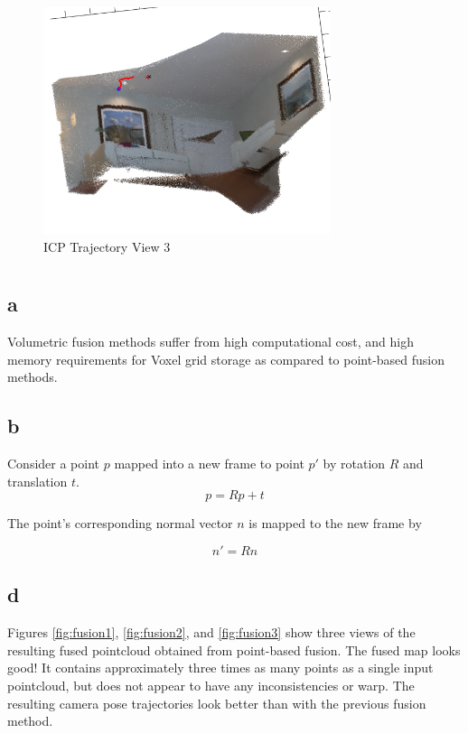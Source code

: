 \documentclass[12pt]{article}
\begin{document}
\begin{figure}[H]
\centering
\includegraphics[page=1,width=0.75\textwidth]{2d_view3}
\caption{ ICP Trajectory View 3 } 
\label{fig:2dview3}
\end{figure}   

\section{}
\subsection{a}
Volumetric fusion methods suffer from high computational cost, and high memory requirements for Voxel grid storage as compared to point-based fusion methods.
\subsection{b}
Consider a point $p$ mapped into a new frame to point $p'$ by rotation $R$ and translation $t$.
\begin{equation}
p = R p + t
\end{equation}
  
The point's corresponding normal vector $n$ is mapped to the new frame by

\begin{equation}
n' = R n
\end{equation}

\subsection{d}
Figures \ref{fig:fusion1}, \ref{fig:fusion2}, and \ref{fig:fusion3} show three views of the resulting fused pointcloud obtained from point-based fusion. The fused map looks good! It contains  approximately three times as many points as a single input pointcloud, but does not appear to have any inconsistencies or warp. The resulting camera pose trajectories look better than with the previous fusion method.
\end{document}
